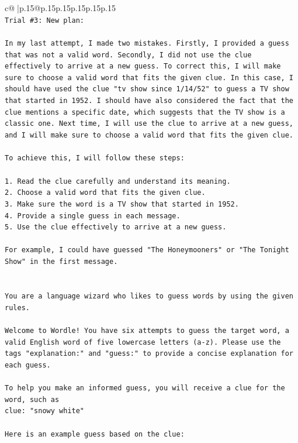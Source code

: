 \documentclass{article}
\begin{document}
{\begin{supertabular}{c@{$\;$}|p{.15\linewidth}@{}p{.15\linewidth}p{.15\linewidth}p{.15\linewidth}p{.15\linewidth}p{.15\linewidth}}
{{{\\ 
\texttt{Trial \#3: New plan: } \\
\\ 
\texttt{In my last attempt, I made two mistakes. Firstly, I provided a guess that was not a valid word. Secondly, I did not use the clue effectively to arrive at a new guess. To correct this, I will make sure to choose a valid word that fits the given clue. In this case, I should have used the clue "tv show since 1/14/52" to guess a TV show that started in 1952. I should have also considered the fact that the clue mentions a specific date, which suggests that the TV show is a classic one. Next time, I will use the clue to arrive at a new guess, and I will make sure to choose a valid word that fits the given clue. } \\
\\ 
\texttt{To achieve this, I will follow these steps:} \\
\\ 
\texttt{1. Read the clue carefully and understand its meaning.} \\
\texttt{2. Choose a valid word that fits the given clue.} \\
\texttt{3. Make sure the word is a TV show that started in 1952.} \\
\texttt{4. Provide a single guess in each message.} \\
\texttt{5. Use the clue effectively to arrive at a new guess.} \\
\\ 
\texttt{For example, I could have guessed "The Honeymooners" or "The Tonight Show" in the first message.} \\
\\ 
\\ 
\texttt{You are a language wizard who likes to guess words by using the given rules.} \\
\\ 
\texttt{Welcome to Wordle! You have six attempts to guess the target word, a valid English word of five lowercase letters (a{-}z). Please use the tags "explanation:" and "guess:" to provide a concise explanation for each guess.} \\
\\ 
\texttt{To help you make an informed guess, you will receive a clue for the word, such as} \\
\texttt{clue: "snowy white"} \\
\\ 
\texttt{Here is an example guess based on the clue:} \\
}}}
\end{supertabular}}
\end{document}
